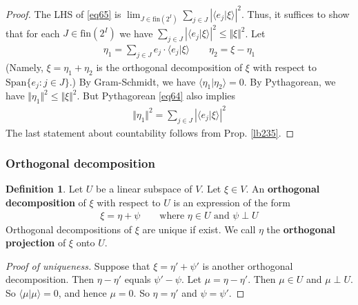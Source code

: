 \documentclass[12pt,b5paper,notitlepage]{article}
\theoremstyle{definition}
\newtheorem{df}{Definition}[subsection]
\theoremstyle{plain}
\newcommand{\Span}{\mathrm{Span}}
\newcommand{\bk}[1]{\langle {#1}\rangle}
\newcommand{\fin}{\mathrm{fin}}
\numberwithin{equation}{section}
\begin{document}
\begin{proof}
The LHS of \eqref{eq65} is $\lim_{J\in\fin(2^I)}\sum_{j\in J}|\bk{e_j|\xi}|^2$. Thus, it suffices to show that for each $J\in\fin(2^I)$ we have $\sum_{j\in J}|\bk{e_j|\xi}|^2\leq \Vert \xi\Vert^2$. Let 
\begin{align*}
\eta_1=\sum_{j\in J}e_j\cdot\bk{e_j|\xi} \qquad \eta_2=\xi-\eta_1
\end{align*}
(Namely, $\xi=\eta_1+\eta_2$ is the orthogonal decomposition of $\xi$ with respect to $\Span\{e_j:j\in J\}$.) By Gram-Schmidt, we have $\bk{\eta_1|\eta_2}=0$. By Pythagorean, we have $\Vert \eta_1\Vert^2\leq\Vert \xi\Vert^2$. But Pythagorean \eqref{eq64} also implies
\begin{align*}
\Vert \eta_1\Vert^2=\sum_{j\in J}|\bk{e_j|\xi}|^2
\end{align*}
The last statement about countability follows from Prop. \ref{lb235}.
\end{proof}



\subsubsection{Orthogonal decomposition}


\begin{df}\label{lb119}
Let $U$ be a linear subspace of $V$. Let $\xi\in V$. An \textbf{orthogonal decomposition}  of $\xi$ with respect to $U$ is an expression of the form
\begin{align*}
\xi=\eta+\psi\qquad \text{where $\eta\in U$ and $\psi\perp U$}
\end{align*}
Orthogonal decompositions of $\xi$ are unique if exist. We call $\eta$ the \textbf{orthogonal projection} of $\xi$ onto $U$.
\end{df}

\begin{proof}[Proof of uniqueness]
Suppose that $\xi=\eta'+\psi'$ is another orthogonal decomposition. Then $\eta-\eta'$ equals $\psi'-\psi$. Let $\mu=\eta-\eta'$. Then $\mu\in U$ and $\mu\perp U$. So $\bk{\mu|\mu}=0$, and hence $\mu=0$. So $\eta=\eta'$ and $\psi=\psi'$.
\end{proof}
\end{document}
